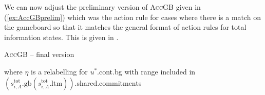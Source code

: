 We can now adjust the preliminary version of \textsc{AccGB} given in
(\ref{ex:AccGBprelim}) which was the action rule for cases where there is a
match on the gameboard so that it matches the general format of action
rules for
total information states.  This is given in \nexteg{}.%
\begin{sidewaysfigure}
\begin{ex} 
  \textsc{AccGB} -- final version
  
\hspace*{-2.5em}
where $\eta$ is a relabelling for $u^*$.cont.bg with range included in $(s_{i,A}^{\text{tot}}.\text{gb}(s_{i,A}^{\text{tot}}.\text{ltm}))$.shared.commitments
\label{ex:AccGBfinal} 
\end{ex}
\end{sidewaysfigure}


